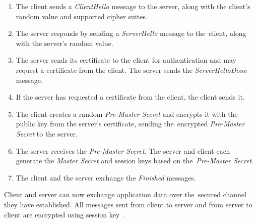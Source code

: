 \documentclass[
  twoside, 12pt, 
  printed, %
  notable,   %
  lof,     %
  lot,     %
]{fithesis3}
\begin{document}
\begin{enumerate}
\item The client sends a \textit{ClientHello} message to the server, along with the client's random value and supported cipher suites.
\item The server responds by sending a \textit{ServerHello} message to the~client, along with the server's random value.
\item The server sends its certificate to the client for authentication and may request a certificate from the client. The server sends the \textit{ServerHelloDone} message.
\item If the server has requested a certificate from the client, the client sends it.
\item The client creates a random \textit{Pre-Master Secret} and encrypts it with the public key from the server's certificate, sending the~encrypted \textit{Pre-Master Secret} to the server.
\item The server receives the \textit{Pre-Master Secret}. The server and client each generate the \textit{Master Secret} and session keys based on the~\textit{Pre-Master Secret}.
\item The client and the server exchange the \textit{Finished} messages.
\end{enumerate}

Client and server can now exchange application data over the~secured channel they have established. 
All messages sent from client to server and from server to client are encrypted using session 
key~\cite{handshakeprotocol}.
\end{document}
